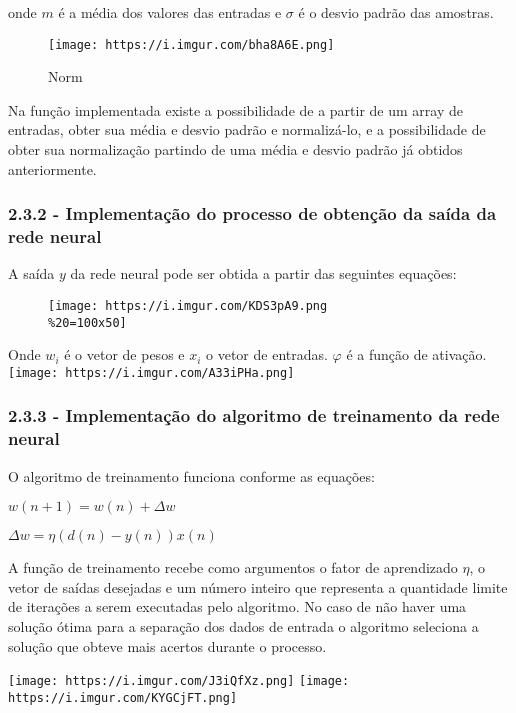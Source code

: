 \documentclass[11pt]{article}
\makeatletter
\def\maxwidth{\ifdim\Gin@nat@width>\linewidth\linewidth
    \else\Gin@nat@width\fi}
\let\Oldincludegraphics\includegraphics
\renewcommand{\includegraphics}[1]{\Oldincludegraphics[width=.8\maxwidth]{#1}}
\makeatother
\begin{document}
onde \(m\) é a média dos valores das entradas e \(\sigma\) é o desvio
padrão das amostras.

\begin{figure}
\centering
\texttt{[image: https://i.imgur.com/bha8A6E.png]}
\caption{Norm}
\end{figure}

    Na função implementada existe a possibilidade de a partir de um array de
entradas, obter sua média e desvio padrão e normalizá-lo, e a
possibilidade de obter sua normalização partindo de uma média e desvio
padrão já obtidos anteriormente.

\subsubsection{2.3.2 - Implementação do processo de obtenção da saída da
rede
neural}\label{implementauxe7uxe3o-do-processo-de-obtenuxe7uxe3o-da-sauxedda-da-rede-neural}

A saída \(y\) da rede neural pode ser obtida a partir das seguintes
equações:

\begin{figure}
\centering
\texttt{[image: https://i.imgur.com/KDS3pA9.png\\\%20=100x50]}
\caption{}
\end{figure}

Onde \(w_i\) é o vetor de pesos e \(x_i\) o vetor de entradas.
\(\varphi\) é a função de ativação.
\texttt{[image: https://i.imgur.com/A33iPHa.png]}

    \subsubsection{2.3.3 - Implementação do algoritmo de treinamento da rede
neural}\label{implementauxe7uxe3o-do-algoritmo-de-treinamento-da-rede-neural}

O algoritmo de treinamento funciona conforme as equações:

\(w(n+1) = w(n) + \Delta w\)

\(\Delta w = \eta (d(n)-y(n))x(n)\)

A função de treinamento recebe como argumentos o fator de aprendizado
\(\eta\), o vetor de saídas desejadas e um número inteiro que representa
a quantidade limite de iterações a serem executadas pelo algoritmo. No
caso de não haver uma solução ótima para a separação dos dados de
entrada o algoritmo seleciona a solução que obteve mais acertos durante
o processo.

\texttt{[image: https://i.imgur.com/J3iQfXz.png]}
\texttt{[image: https://i.imgur.com/KYGCjFT.png]}
\end{document}

